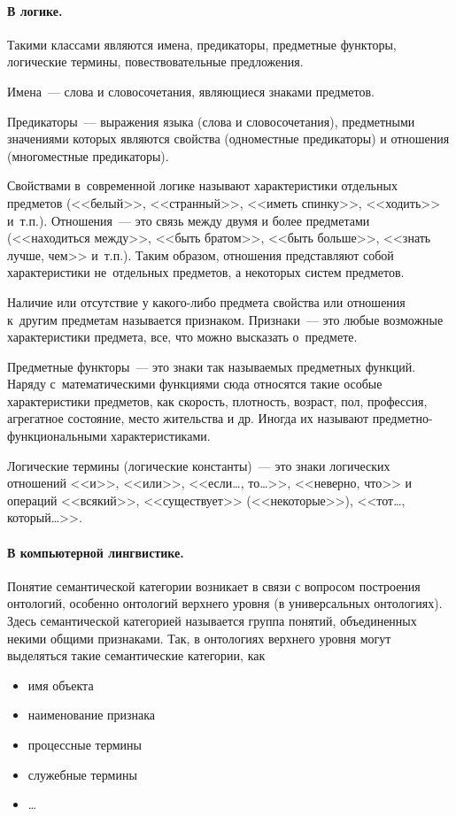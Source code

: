 \documentclass[12pt]{article}
\theoremstyle{definition}
\theoremstyle{remark}
\numberwithin{equation}{section}
\begin{document}
\paragraph{В логике.}
Такими классами являются имена, предикаторы, предметные функторы,
логические термины, повествовательные предложения.

Имена~--- слова и словосочетания, являющиеся знаками предметов.

Предикаторы~--- выражения языка (слова и словосочетания), предметными
значениями которых являются свойства (одноместные предикаторы)
и отношения (многоместные предикаторы).

Свойствами в~современной логике называют характеристики отдельных предметов
(<<белый>>, <<странный>>, <<иметь спинку>>, <<ходить>> и~т.п.).
Отношения~--- это связь между двумя и более предметами (<<находиться
между>>, <<быть братом>>, <<быть больше>>, <<знать лучше, чем>> и~т.п.).
Таким образом, отношения представляют собой характеристики не~отдельных
предметов, а некоторых систем предметов.

Наличие или отсутствие у какого-либо предмета свойства или отношения
к~другим предметам называется признаком. Признаки~--- это любые возможные
характеристики предмета, все, что можно высказать о~предмете.

Предметные функторы~--- это знаки так называемых предметных функций.
Наряду с~математическими функциями сюда относятся такие особые
характеристики предметов, как скорость, плотность, возраст, пол,
профессия, агрегатное состояние, место жительства и др.
Иногда их называют предметно-функциональными характеристиками.

Логические термины (логические константы)~--- это знаки логических
отношений <<и>>, <<или>>, <<если\dots, то\dots>>, <<неверно, что>>
и операций <<всякий>>, <<существует>> (<<некоторые>>), <<тот…, который…>>.

\paragraph{В компьютерной лингвистике.}
Понятие семантической категории возникает в связи с вопросом построения онтологий, особенно онтологий верхнего уровня (в универсальных онтологиях). Здесь семантической категорией называется группа понятий, объединенных некими общими признаками. Так, в онтологиях верхнего уровня могут выделяться такие семантические категории, как
\begin{itemize}
	\item имя объекта
	\item наименование признака
	\item процессные термины
	\item служебные термины
	\item \dots
\end{itemize} 
\end{document}
